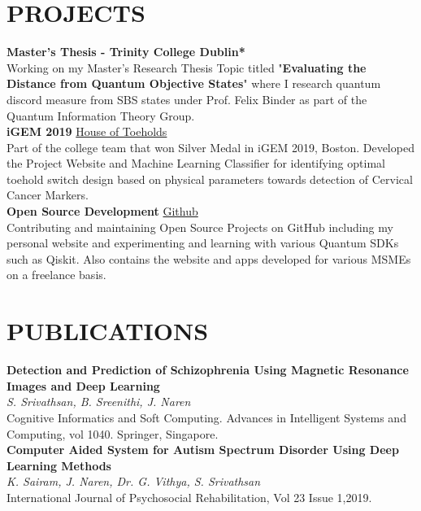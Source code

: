 \documentclass[a4paper,9pt]{extarticle}
\begin{document}
\section*{PROJECTS}
\noindent
\textbf{Master's Thesis - Trinity College Dublin*}\\[1pt]
Working on my Master's Research Thesis Topic titled "\textbf{Evaluating the Distance from Quantum Objective States}" where I research
quantum discord measure from SBS states under Prof. Felix Binder as part of the Quantum Information Theory Group.\\

\noindent
\textbf{iGEM 2019} \hfill \href{https://2019.igem.org/Team:SASTRA_Thanjavur}{House of Toeholds \faExternalLink}\\[1pt]
Part of the college team that won Silver Medal in iGEM 2019, Boston. Developed the Project Website and Machine Learning
Classifier for identifying optimal toehold switch design based on physical parameters towards detection of Cervical Cancer
Markers.\\

\noindent
\textbf{Open Source Development} \hfill \href{https://github.com/vathzen}{ Github \faExternalLink}\\[1pt]
Contributing and maintaining Open Source Projects on GitHub including my personal website and experimenting and learning with various Quantum SDKs such as Qiskit. Also contains
the website and apps developed for various MSMEs on a freelance basis.

\section*{PUBLICATIONS}
\noindent
\textbf{Detection and Prediction of Schizophrenia Using Magnetic Resonance Images and Deep Learning}\\[1pt]
\textit{S. Srivathsan, B. Sreenithi, J. Naren}\\[1pt]
Cognitive Informatics and Soft Computing. Advances in Intelligent Systems and Computing, vol 1040. Springer, Singapore.\\

\noindent
\textbf{Computer Aided System for Autism Spectrum Disorder Using Deep Learning Methods}\\[1pt]
\textit{K. Sairam, J. Naren, Dr. G. Vithya, S. Srivathsan}\\[1pt]
International Journal of Psychosocial Rehabilitation, Vol 23 Issue 1,2019.\\
\end{document}
